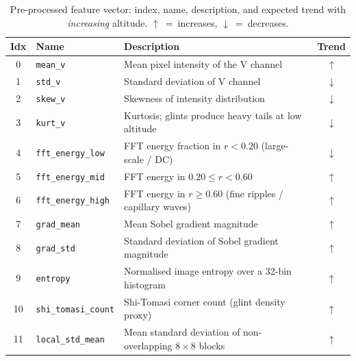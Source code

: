 \begin{table}[htbp]
    \caption{Pre-processed feature vector: index, name, description, and
             expected trend with \emph{increasing} altitude.
             $\uparrow$~=~increases, $\downarrow$~=~decreases.}
    \begin{center}
        \small
        \begin{tabular}{|c|l|p{7cm}|c|}
        \hline
        \textbf{Idx} & \textbf{Name} & \textbf{Description} & \textbf{Trend} \\
        \hline
        0  & \texttt{mean\_v}
           & Mean pixel intensity of the V channel
           & $\uparrow$ \\
        \hline
        1  & \texttt{std\_v}
           & Standard deviation of V channel
           & $\downarrow$ \\
        \hline
        2  & \texttt{skew\_v}
           & Skewness of intensity distribution
           & $\downarrow$ \\
        \hline
        3  & \texttt{kurt\_v}
           & Kurtosis; glints produce heavy tails at low altitude
           & $\downarrow$ \\
        \hline
        4  & \texttt{fft\_energy\_low}
           & FFT energy fraction in $r < 0.20$ (large-scale / DC)
           & $\downarrow$ \\
        \hline
        5  & \texttt{fft\_energy\_mid}
           & FFT energy in $0.20 \leq r < 0.60$
           & $\uparrow$ \\
        \hline
        6  & \texttt{fft\_energy\_high}
           & FFT energy in $r \geq 0.60$ (fine ripples / capillary waves)
           & $\uparrow$ \\
        \hline
        7  & \texttt{grad\_mean}
           & Mean Sobel gradient magnitude
           & $\uparrow$ \\
        \hline
        8  & \texttt{grad\_std}
           & Standard deviation of Sobel gradient magnitude
           & $\uparrow$ \\
        \hline
        9  & \texttt{entropy}
           & Normalised image entropy over a 32-bin histogram
           & $\uparrow$ \\
        \hline
        10 & \texttt{shi\_tomasi\_count}
           & Shi-Tomasi corner count (glint density proxy)
           & $\uparrow$ \\
        \hline
        11 & \texttt{local\_std\_mean}
           & Mean standard deviation of non-overlapping $8\times8$ blocks
           & $\uparrow$ \\
        \hline
        \end{tabular}
    \label{tab:features}
    \end{center}
\end{table}

